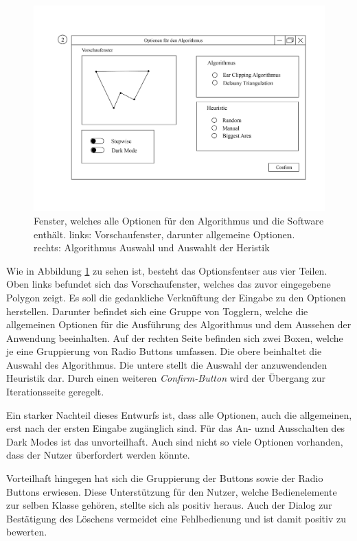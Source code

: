     \begin{figure}[h]
        \includegraphics[width=1\textwidth]{bilder/optionsfenster.png}
        \caption[Ausgelagertes Optionsfenster]{Fenster, welches alle Optionen für den Algorithmus und die Software enthält. links: Vorschaufenster, darunter allgemeine Optionen. rechts: Algorithmus
        Auswahl und Auswahlt der Heristik}
        \label{fig:options}
    \end{figure}

Wie in Abbildung \ref{fig:options} zu sehen ist, besteht das Optionsfentser aus vier Teilen. Oben links befundet sich das Vorschaufenster, welches das zuvor eingegebene Polygon zeigt. Es soll die gedankliche Verknüftung der Eingabe zu den Optionen herstellen.
Darunter befindet sich eine Gruppe von Togglern, welche die allgemeinen Optionen für die Ausführung des Algorithmus und dem Aussehen der Anwendung beeinhalten.
Auf der rechten Seite befinden sich zwei Boxen, welche je eine Gruppierung von Radio Buttons umfassen. Die obere beinhaltet die Auswahl des Algorithmus. Die untere stellt die Auswahl der anzuwendenden Heuristik dar.
Durch einen weiteren \emph{Confirm-Button} wird der Übergang zur Iterationsseite geregelt.

Ein starker Nachteil dieses Entwurfs ist, dass alle Optionen, auch die allgemeinen, erst nach der ersten Eingabe zugänglich sind. Für das An- uznd Ausschalten des 
Dark Modes ist das unvorteilhaft. Auch sind nicht so viele Optionen vorhanden, dass der Nutzer überfordert werden könnte. 

Vorteilhaft hingegen hat sich die Gruppierung der Buttons sowie der Radio Buttons erwiesen. Diese Unterstützung für den Nutzer, welche Bedienelemente zur selben Klasse gehören, stellte sich als positiv heraus.
Auch der Dialog zur Bestätigung des Löschens vermeidet eine Fehlbedienung und ist damit positiv zu bewerten.

